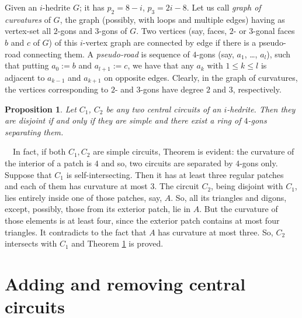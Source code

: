\documentclass[12pt]{article}
\newtheorem{proposition}{Proposition}
\newcommand{\proof}{\noindent{\bf Proof.}\ \ }
\begin{document}
Given an $i$-hedrite $G$; it has $p_2=8-i$, $p_3=2i-8$. Let us 
call {\em graph of curvatures} of $G$, the graph (possibly, with loops 
and multiple edges) having as vertex-set all $2$-gons and $3$-gons of $G$. 
Two vertices (say, faces, $2$- or $3$-gonal faces $b$ and $c$ of $G$) of 
this $i$-vertex graph are connected by edge if there is a pseudo-road 
connecting them. A {\em pseudo-road} is sequence of $4$-gons 
(say, $a_1$, \dots, $a_l$), such that putting $a_0:=b$ and $a_{l+1}:=c$, 
we have that any $a_k$ with $1\leq k\leq l$ is adjacent to $a_{k-1}$ 
and $a_{k+1}$ on opposite edges. Clearly, in the graph of curvatures, 
the vertices corresponding to $2$- and $3$-gons have degree $2$ and $3$, 
respectively.







\begin{proposition}\label{intersec}
Let $C_1$, $C_2$ be any two central circuits of an $i$-hedrite. Then 
they are disjoint if and only if they are simple and there exist a 
ring of $4$-gons separating them.

\end{proposition}
\proof In fact, if both $C_1,C_2$ are simple circuits, Theorem is evident:
the curvature of the interior of a patch is $4$ and so, two
circuits are separated by $4$-gons only. Suppose that $C_1$ is 
self-intersecting. Then it has at least three regular patches and each 
of them has curvature at most $3$.
The circuit $C_2$, being disjoint with $C_1$, lies entirely inside one 
of those patches, say, $A$. So, all its triangles and digons, except, 
possibly, those from its exterior patch, lie in $A$. But the curvature 
of those elements is at least four, since the exterior
patch contains at most four triangles. It contradicts to the fact that $A$
has curvature at most three. So, $C_2$ intersects with $C_1$ and 
Theorem \ref{intersec} is proved.








\section{Adding and removing central circuits}


%
%
%
%
%
\end{document}
